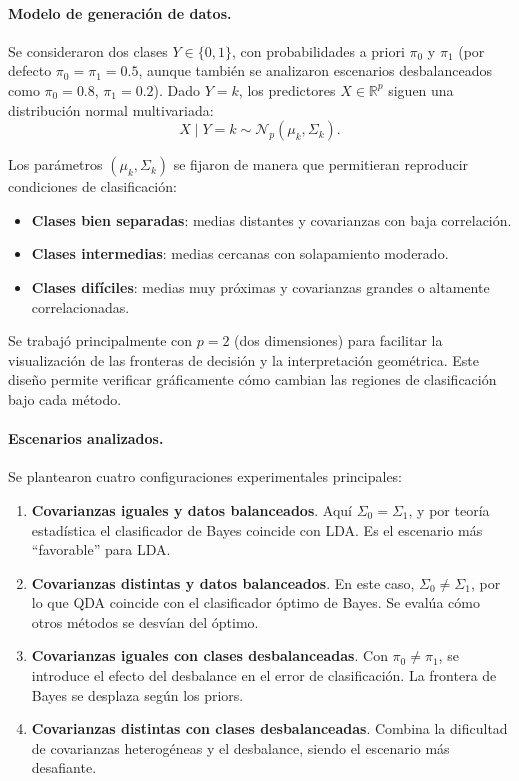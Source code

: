 \documentclass[10pt]{article}
\begin{document}
\paragraph{Modelo de generación de datos.}
Se consideraron dos clases $Y \in \{0,1\}$, con probabilidades a priori $\pi_0$ y $\pi_1$ (por defecto $\pi_0=\pi_1=0.5$, aunque también se analizaron escenarios desbalanceados como $\pi_0=0.8$, $\pi_1=0.2$).  
Dado $Y=k$, los predictores $X \in \mathbb{R}^p$ siguen una distribución normal multivariada:
\[
X \mid Y=k \sim \mathcal{N}_p(\mu_k, \Sigma_k).
\]

Los parámetros $(\mu_k, \Sigma_k)$ se fijaron de manera que permitieran reproducir condiciones de clasificación:
\begin{itemize}
    \item \textbf{Clases bien separadas}: medias distantes y covarianzas con baja correlación.
    \item \textbf{Clases intermedias}: medias cercanas con solapamiento moderado.
    \item \textbf{Clases difíciles}: medias muy próximas y covarianzas grandes o altamente correlacionadas.
\end{itemize}

Se trabajó principalmente con $p=2$ (dos dimensiones) para facilitar la visualización de las fronteras de decisión y la interpretación geométrica. Este diseño permite verificar gráficamente cómo cambian las regiones de clasificación bajo cada método.

\paragraph{Escenarios analizados.}
Se plantearon cuatro configuraciones experimentales principales:
\begin{enumerate}
    \item \textbf{Covarianzas iguales y datos balanceados}. Aquí $\Sigma_0 = \Sigma_1$, y por teoría estadística el clasificador de Bayes coincide con LDA. Es el escenario más “favorable” para LDA.
    \item \textbf{Covarianzas distintas y datos balanceados}. En este caso, $\Sigma_0 \neq \Sigma_1$, por lo que QDA coincide con el clasificador óptimo de Bayes. Se evalúa cómo otros métodos se desvían del óptimo.
    \item \textbf{Covarianzas iguales con clases desbalanceadas}. Con $\pi_0 \neq \pi_1$, se introduce el efecto del desbalance en el error de clasificación. La frontera de Bayes se desplaza según los priors.
    \item \textbf{Covarianzas distintas con clases desbalanceadas}. Combina la dificultad de covarianzas heterogéneas y el desbalance, siendo el escenario más desafiante.
\end{enumerate}
\end{document}
